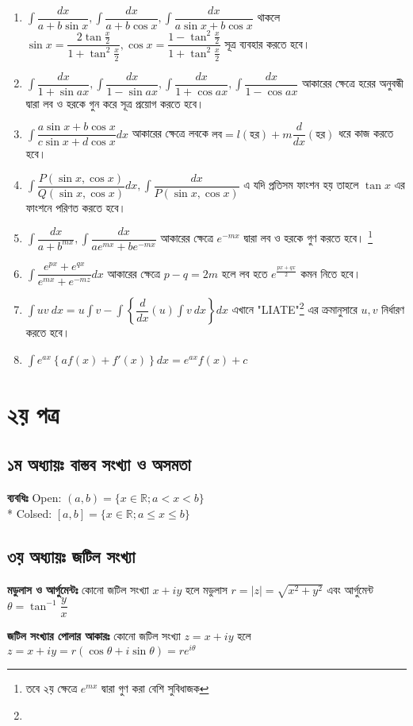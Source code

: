 \documentclass[a4paper,12pt]{article}
\newcommand{\dd}{\displaystyle}
\newcommand{\lt}{\left}
\newcommand{\rt}{\right}
\newcommand{\tm}{\item}
\newcommand{\eng}{\textenglish}
\begin{document}
\begin{enumerate}[ wide=0em, label=\textenglish{\textbf{ Type: \arabic*.}}, itemsep=0pt, parsep=1ex]
    \tm $\dd \int \dfrac{dx}{a+b\sin x}, \int \dfrac{dx}{a+b \cos x}, \int \dfrac{dx}{a\sin x + b\cos x}$ থাকলে $\sin x= \dfrac{2 \tan \frac{x}{2}}{1+\tan^2 \frac{x}{2}}, \cos x = \dfrac{1-\tan ^2 \frac{x}{2}}{1+\tan^2 \frac{x}{2}} $ সূত্র ব্যবহার করতে হবে। 
    \tm $\dd \int \dfrac{dx}{1+ \sin ax}, \int \dfrac{dx}{1-\sin ax}, \int \dfrac{dx}{1+\cos ax}, \int \dfrac{dx}{1-\cos ax}$ আকারের ক্ষেত্রে হরের অনুবন্ধী দ্বারা লব ও হরকে গুন করে সূত্র প্রয়োগ করতে হবে। 
    \tm $\dd \int \dfrac{a \sin x +b \cos x}{c \sin x + d \cos x} dx$ আকারের ক্ষেত্রে লবকে $\text{লব}= l(\text{হর})+ m \dfrac{d}{dx} (\text{হর})$ ধরে কাজ করতে হবে। 
    \tm $\dd \int \dfrac{P(\sin x, \cos x)}{Q(\sin x, \cos x)}dx, \int \dfrac{dx}{P(\sin x, \cos x)}$ এ যদি প্রতিসম ফাংশন হয় তাহলে $\tan x$ এর ফাংশনে পরিণত করতে হবে। 
    \tm $\dd \int \dfrac{dx}{a+b^{mx}}, \int \dfrac{dx}{ae^{mx}+be^{-mx}}$ আকারের ক্ষেত্রে $e^{-mx}$ দ্বারা লব ও হরকে গুণ করতে হবে। \footnote{তবে ২য় ক্ষেত্রে $e^{mx}$ দ্বারা গুণ করা বেশি সুবিধাজক}
    \tm $\dd \int \dfrac{e^{px}+e^{qx}}{e^{mx}+e^{-mz}} dx$ আকারের ক্ষেত্রে $p-q=2m$ হলে লব হতে $e^{\frac{px+qx}{2}}$ কমন নিতে হবে। 
    \tm $\dd \int uv \ dx = u\int v-\int \lt\{\dfrac{d}{dx}(u) \int v \ dx\rt\} dx$ এখানে \eng{"LIATE"}\footnote{} এর ক্রমানুসারে $u, v$ নির্ধারণ করতে হবে। 
    \tm $\dd \int e^{ax}\lt\{af(x)+f'(x) \rt\}dx= e^{ax}f(x)+c$
\end{enumerate}

\newpage 

\section{২য় পত্র}
\subsection{১ম অধ্যায়ঃ বাস্তব সংখ্যা ও অসমতা}
\textbf{ব্যবধিঃ} \eng{Open:} $(a,b)= \{x \in \mathbb{R} ; a <x<b \}$\\*
\eng{Colsed:} $[a,b]= \{x \in \mathbb{R}; a \leq x \leq b \}$

\subsection{৩য় অধ্যায়ঃ জটিল সংখ্যা}
\textbf{মডুলাস ও আর্গুমেন্টঃ} কোনো জটিল সংখ্যা $x+iy$ হলে মডুলাস $r=|z|=\sqrt{x^2+y^2}$ এবং আর্গুমেন্ট $\theta= \tan^{-1} \dfrac{y}{x}$

\textbf{জটিল সংখ্যার পোলার আকারঃ} কোনো জটিল সংখ্যা $z=x+iy$ হলে $z=x+iy=r(\cos \theta + i \sin \theta)=re^{i\theta}$ 
\end{document}
